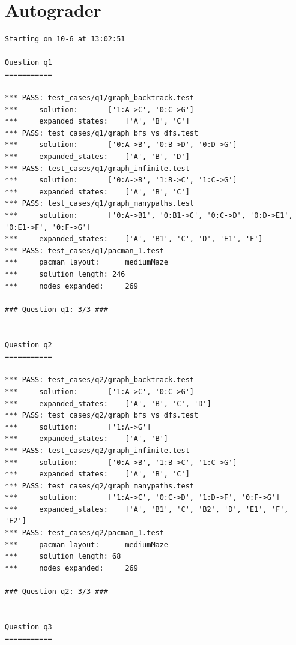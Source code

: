 \documentclass{report}
\begin{document}
      \clearpage\section{Autograder}
          \begin{lstlisting}
Starting on 10-6 at 13:02:51

Question q1
===========

*** PASS: test_cases/q1/graph_backtrack.test
*** 	solution:		['1:A->C', '0:C->G']
*** 	expanded_states:	['A', 'B', 'C']
*** PASS: test_cases/q1/graph_bfs_vs_dfs.test
*** 	solution:		['0:A->B', '0:B->D', '0:D->G']
*** 	expanded_states:	['A', 'B', 'D']
*** PASS: test_cases/q1/graph_infinite.test
*** 	solution:		['0:A->B', '1:B->C', '1:C->G']
*** 	expanded_states:	['A', 'B', 'C']
*** PASS: test_cases/q1/graph_manypaths.test
*** 	solution:		['0:A->B1', '0:B1->C', '0:C->D', '0:D->E1', '0:E1->F', '0:F->G']
*** 	expanded_states:	['A', 'B1', 'C', 'D', 'E1', 'F']
*** PASS: test_cases/q1/pacman_1.test
*** 	pacman layout:		mediumMaze
*** 	solution length: 246
*** 	nodes expanded:		269

### Question q1: 3/3 ###


Question q2
===========

*** PASS: test_cases/q2/graph_backtrack.test
*** 	solution:		['1:A->C', '0:C->G']
*** 	expanded_states:	['A', 'B', 'C', 'D']
*** PASS: test_cases/q2/graph_bfs_vs_dfs.test
*** 	solution:		['1:A->G']
*** 	expanded_states:	['A', 'B']
*** PASS: test_cases/q2/graph_infinite.test
*** 	solution:		['0:A->B', '1:B->C', '1:C->G']
*** 	expanded_states:	['A', 'B', 'C']
*** PASS: test_cases/q2/graph_manypaths.test
*** 	solution:		['1:A->C', '0:C->D', '1:D->F', '0:F->G']
*** 	expanded_states:	['A', 'B1', 'C', 'B2', 'D', 'E1', 'F', 'E2']
*** PASS: test_cases/q2/pacman_1.test
*** 	pacman layout:		mediumMaze
*** 	solution length: 68
*** 	nodes expanded:		269

### Question q2: 3/3 ###


Question q3
===========


\end{lstlisting}
\end{document}
